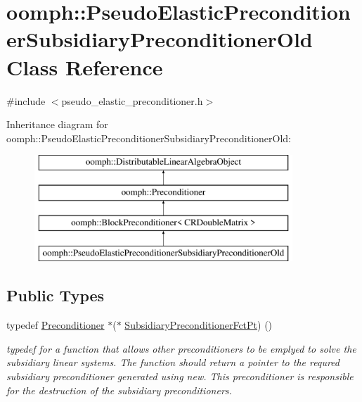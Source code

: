 \hypertarget{classoomph_1_1PseudoElasticPreconditionerSubsidiaryPreconditionerOld}{}\section{oomph\+:\+:Pseudo\+Elastic\+Preconditioner\+Subsidiary\+Preconditioner\+Old Class Reference}
\label{classoomph_1_1PseudoElasticPreconditionerSubsidiaryPreconditionerOld}


{\ttfamily \#include $<$pseudo\+\_\+elastic\+\_\+preconditioner.\+h$>$}

Inheritance diagram for oomph\+:\+:Pseudo\+Elastic\+Preconditioner\+Subsidiary\+Preconditioner\+Old\+:\begin{figure}[H]
\begin{center}
\leavevmode
\includegraphics[height=4.000000cm]{classoomph_1_1PseudoElasticPreconditionerSubsidiaryPreconditionerOld}
\end{center}
\end{figure}
\subsection*{Public Types}
\begin{DoxyCompactItemize}
\item 
typedef \hyperlink{classoomph_1_1Preconditioner}{Preconditioner} $\ast$($\ast$ \hyperlink{classoomph_1_1PseudoElasticPreconditionerSubsidiaryPreconditionerOld_a2ee5b7ddad26a4eb6662e2b701ab0a52}{Subsidiary\+Preconditioner\+Fct\+Pt}) ()
\begin{DoxyCompactList}\small\item\em typedef for a function that allows other preconditioners to be emplyed to solve the subsidiary linear systems. The function should return a pointer to the requred subsidiary preconditioner generated using new. This preconditioner is responsible for the destruction of the subsidiary preconditioners. \end{DoxyCompactList}\end{DoxyCompactItemize}
